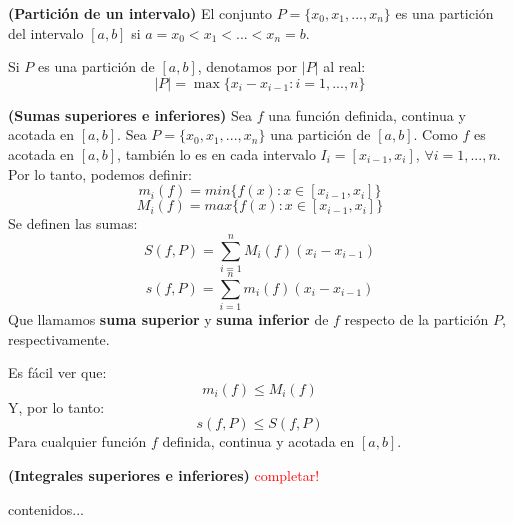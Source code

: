 \begin{definicion}
	\textbf{(Partición de un intervalo)} El conjunto $P = \{ x_0, x_1, ... , x_n\}$ es una partición del intervalo $[a, b]$ si $a = x_0 < x_1 < ... < x_n = b$. 
	
	Si $P$ es una partición de $[a,b]$, denotamos por $|P|$ al real: 
	$$ |P| = \max \{ x_i - x_{i-1} : i = 1, ... , n \} $$ 
\end{definicion}


\begin{definicion}
	\textbf{(Sumas superiores e inferiores)} Sea $f$ una función definida, continua y acotada en $[a, b]$. Sea $P = \{ x_0, x_1, ... , x_n\}$ una partición de $[a, b]$. Como $f$ es acotada en $[a, b]$, también lo es en cada intervalo $I_i = [ x_{i-1}, x_i]$, $\forall i = 1, ..., n$. Por lo tanto, podemos definir: 
	$$ m_i(f) = min\{f(x) : x \in [ x_{i-1}, x_i]\}$$ 
	$$ M_i(f) = max\{f(x) : x \in [ x_{i-1}, x_i]\}$$ 
	Se definen las sumas: 
	$$ S(f, P) = \sum_{i=1}^n M_i(f) (x_i - x_{i-1})$$
	$$ s(f, P) = \sum_{i=1}^n m_i(f) (x_i - x_{i-1})$$
	Que llamamos \textbf{suma superior} y \textbf{suma inferior} de $f$ respecto de la partición $P$, respectivamente. 
\end{definicion}

\begin{nota}
	Es fácil ver que: 
	$$ m_i(f) \leq M_i (f) $$ 
	Y, por lo tanto: 
	$$ s(f, P) \leq S(f, P) $$ 
	Para cualquier función $f$ definida, continua y acotada en $[a, b]$. 
\end{nota}

\begin{definicion}
	\textbf{(Integrales superiores e inferiores)}
	\textcolor{red}{completar!}
\end{definicion}

\begin{definicion}
	contenidos...
\end{definicion}